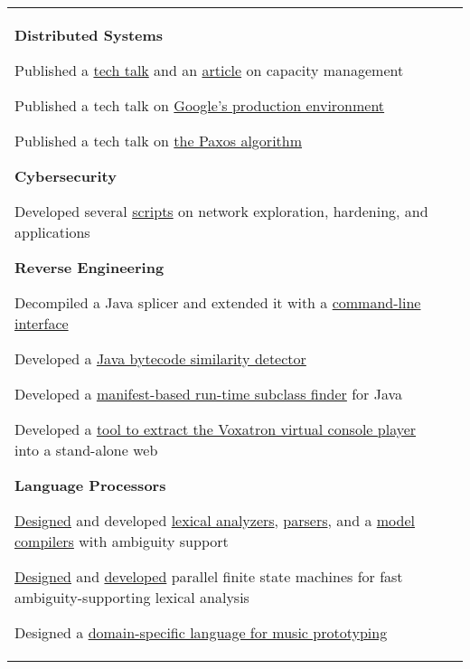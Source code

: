\documentclass[letterpaper,10pt,oneside]{article}
\newcommand{\itemspacingtwo}{\vspace{0.08cm}}
\newenvironment{body}
{\par\par
\begin{longtable}{p{0.145\textwidth}p{0.81\textwidth}}}
{\par\end{longtable}\par}
\begin{document}
\begin{body}
\textbf{Distributed Systems}
\begin{comp}
\item Published a \href{https://youtu.be/pOo0oKNM9I8}{tech talk} and an \href{https://static.googleusercontent.com/media/sre.google/en//static/pdf/login_winter20_10_torres.pdf}{article} on capacity management
\item Published a tech talk on \href{https://youtu.be/dhTVVWzpc4Q}{Google's production environment}
\item Published a tech talk on \href{https://youtu.be/d7nAGI_NZPk}{the Paxos algorithm}
\end{comp}
\itemspacingtwo

\textbf{Cybersecurity}
\begin{comp}
\item Developed several \href{https://github.com/lquesada/My-mIRC-Scripts}{scripts} on network exploration, hardening, and applications
\end{comp}
\itemspacingtwo

\textbf{Reverse Engineering}
\begin{comp}
\item Decompiled a Java splicer and extended it with a \href{https://github.com/lquesada/JarSplicePlus}{command-line interface}
\item Developed a \href{https://github.com/lquesada/JSimil}{Java bytecode similarity detector}
\item Developed a \href{https://github.com/lquesada/RunTimeSubclassFinder}{manifest-based run-time subclass finder} for Java
\item Developed a \href{https://github.com/lquesada/voxatron-in-a-web}{tool to extract the Voxatron virtual console player} into a stand-alone web
\end{comp}
\itemspacingtwo

\textbf{Language Processors}
\begin{comp}
\item \href{https://www.worldscientific.com/doi/abs/10.1142/S0218194014500375}{Designed} and developed \href{https://github.com/lquesada/ModelCC/tree/master/ModelCC/src/org/modelcc/lexer}{lexical analyzers}, \href{https://github.com/lquesada/ModelCC/tree/master/ModelCC/src/org/modelcc/parser}{parsers}, and a \href{https://github.com/lquesada/ModelCC}{model compilers} with ambiguity support
\item \href{https://www.scitepress.org/Link.aspx?doi=10.5220/0003949901050110}{Designed} and \href{https://github.com/lquesada/PFSMs-Java}{developed} parallel finite state machines for fast ambiguity-supporting lexical analysis 
\item Designed a \href{https://github.com/lquesada/ADAgio}{domain-specific language for music prototyping}
\end{comp}
\itemspacingtwo


\end{body}
\end{document}
